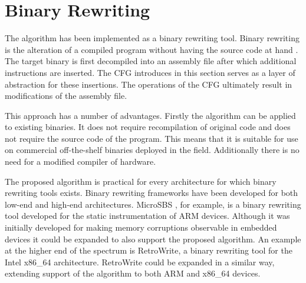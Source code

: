 \section{Binary Rewriting}
\label{sec:rewriting}
The algorithm has been implemented as a binary rewriting tool. 
Binary rewriting is the alteration of a compiled program without having the source code at hand \cite{rewriting-survey}.
The target binary is first decompiled into an assembly file after which additional instructions are inserted. 
The CFG introduces in this section serves as a layer of abstraction for these insertions. 
The operations of the CFG ultimately result in modifications of the assembly file. 

This approach has a number of advantages. 
Firstly the algorithm can be applied to existing binaries. It does not require recompilation of original code and does not require the source code of the program. 
This means that it is suitable for use on commercial off-the-shelf binaries deployed in the field. 
Additionally there is no need for a modified compiler of hardware. 

The proposed algorithm is practical for every architecture for which binary rewriting tools exists. Binary rewriting frameworks have been developed for both low-end and high-end architectures. 
MicroSBS \cite{microsbs}, for example, is a binary rewriting tool developed for the static instrumentation of ARM devices. Although it was initially developed for making memory corruptions observable in embedded devices it 
could be expanded to also support the proposed algorithm. An example at the higher end of the spectrum is RetroWrite, a binary rewriting tool for the Intel x86\_64 architecture.
RetroWrite could be expanded in a similar way, extending support of the algorithm to both ARM and x86\_64 devices. 
